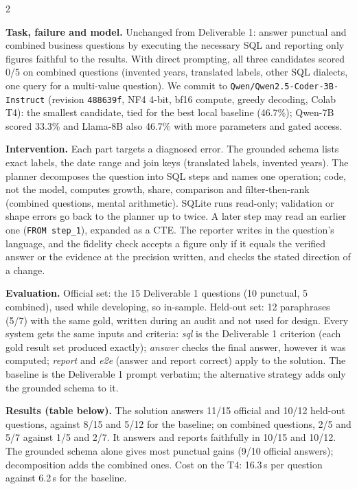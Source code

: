 \documentclass[10pt]{article}
\newcommand{\head}[1]{\textbf{\color{ucblue}#1}\hspace{0.4em}}
\begin{document}
\begin{multicols}{2}
\small

\head{Task, failure and model.} Unchanged from Deliverable 1: answer punctual and combined business
questions by executing the necessary SQL and reporting only figures faithful to the results. With
direct prompting, all three candidates scored 0/5 on combined questions (invented years,
translated labels, other SQL dialects, one query for a multi-value question). We commit to
\texttt{Qwen/Qwen2.5-Coder-3B-Instruct} (revision \texttt{488639f}, NF4 4-bit, bf16 compute, greedy
decoding, Colab T4): the smallest candidate, tied for the best local baseline (46.7\%);
Qwen-7B scored 33.3\% and Llama-8B also 46.7\% with more parameters and gated access.

\head{Intervention.} Each part targets a diagnosed error. The grounded schema lists exact labels,
the date range and join keys (translated labels, invented years). The planner decomposes the
question into SQL steps and names one operation; code, not the model, computes growth, share,
comparison and filter-then-rank (combined questions, mental arithmetic). SQLite runs read-only;
validation or shape errors go back to the planner up to twice. A later step may read an
earlier one (\texttt{FROM step\_1}), expanded as a CTE. The reporter writes in the question's
language, and the fidelity check accepts a figure only if it equals the verified answer or
the evidence at the precision written, and checks the stated direction of a change.

\head{Evaluation.} Official set: the 15 Deliverable 1 questions (10 punctual, 5 combined), used
while developing, so in-sample. Held-out set: 12 paraphrases (5/7) with the same gold, written
during an audit and not used for design. Every system gets the same inputs and criteria:
\textit{sql} is the Deliverable 1 criterion (each gold result set produced exactly);
\textit{answer} checks the final answer, however it was computed; \textit{report} and
\textit{e2e} (answer and report correct) apply to the solution. The baseline is the
Deliverable 1 prompt verbatim; the alternative strategy adds only the grounded schema to it.

\head{Results (table below).} The solution answers 11/15 official and 10/12 held-out
questions, against 8/15 and 5/12 for the baseline; on combined questions, 2/5 and 5/7
against 1/5 and 2/7. It answers and reports faithfully in 10/15 and 10/12. The grounded schema
alone gives most punctual gains (9/10 official answers); decomposition adds the combined ones.
Cost on the T4: 16.3\,s per question against 6.2\,s for the baseline.


\end{multicols}
\end{document}
